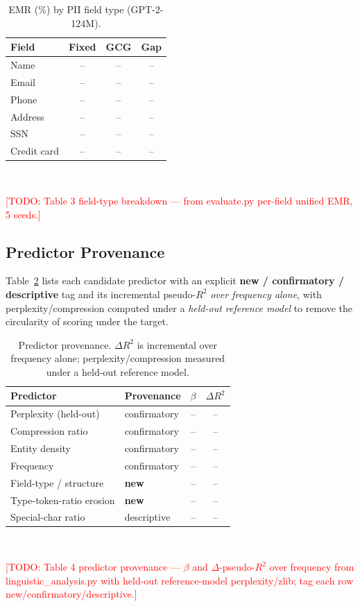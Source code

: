 \documentclass[letterpaper,twocolumn,10pt]{article}
\newcommand{\todo}[1]{\textcolor{red}{[TODO: #1]}}
\begin{document}
\begin{table}[t]
\centering
\caption{EMR (\%) by PII field type (GPT-2-124M).}
\label{tab:field}
\small
\begin{tabular}{@{}lccc@{}}
\toprule
\textbf{Field} & \textbf{Fixed} & \textbf{GCG} & \textbf{Gap} \\
\midrule
Name        & -- & -- & -- \\
Email       & -- & -- & -- \\
Phone       & -- & -- & -- \\
Address     & -- & -- & -- \\
SSN         & -- & -- & -- \\
Credit card & -- & -- & -- \\
\bottomrule
\end{tabular}
\\[2pt]
\raggedright\footnotesize
\todo{Table 3 field-type breakdown --- from evaluate.py per-field unified EMR,
5 seeds.}
\end{table}

\subsection{Predictor Provenance}
Table~\ref{tab:predictors} lists each candidate predictor with an explicit
\textbf{new / confirmatory / descriptive} tag and its incremental
pseudo-$R^2$ \emph{over frequency alone}, with perplexity/compression computed
under a \emph{held-out reference model} to remove the circularity of scoring
under the target.

\begin{table}[t]
\centering
\caption{Predictor provenance. $\Delta R^2$ is incremental over frequency
alone; perplexity/compression measured under a held-out reference model.}
\label{tab:predictors}
\small
\begin{tabular}{@{}llcc@{}}
\toprule
\textbf{Predictor} & \textbf{Provenance} & $\beta$ & $\Delta R^2$ \\
\midrule
Perplexity (held-out)   & confirmatory & -- & -- \\
Compression ratio       & confirmatory & -- & -- \\
Entity density          & confirmatory & -- & -- \\
Frequency               & confirmatory & -- & -- \\
Field-type / structure  & \textbf{new} & -- & -- \\
Type-token-ratio erosion & \textbf{new} & -- & -- \\
Special-char ratio      & descriptive  & -- & -- \\
\bottomrule
\end{tabular}
\\[2pt]
\raggedright\footnotesize
\todo{Table 4 predictor provenance --- $\beta$ and $\Delta$-pseudo-$R^2$ over
frequency from linguistic\_analysis.py with held-out reference-model
perplexity/zlib; tag each row new/confirmatory/descriptive.}
\end{table}
\end{document}
